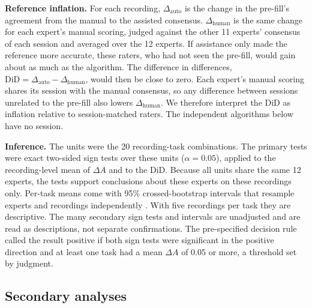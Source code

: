 \documentclass[11pt]{article}
\newcommand{\dA}{\Delta A}
\newcommand{\dauto}{\Delta_{\mathrm{auto}}}
\newcommand{\dhuman}{\Delta_{\mathrm{human}}}
\begin{document}
\textbf{Reference inflation.} For each recording, $\dauto$ is the change in the pre-fill's agreement from the manual
to the assisted consensus. $\dhuman$ is the same change for each expert's manual scoring, judged against the other
11 experts' consensus of each session and averaged over the 12 experts. If assistance only made the reference more
accurate, these raters, who had not seen the pre-fill, would gain about as much as the algorithm. The difference in
differences, $\mathrm{DiD}=\dauto-\dhuman$, would then be close to zero. Each expert's manual scoring shares its
session with the manual consensus, so any difference between sessions unrelated to the pre-fill also lowers
$\dhuman$. We therefore interpret the DiD as inflation relative to session-matched raters. The independent algorithms
below have no session.

\textbf{Inference.} The units were the 20 recording-task combinations. The primary tests were exact two-sided sign
tests over these units ($\alpha=0.05$), applied to the recording-level mean of $\dA$ and to the DiD. Because all units share the same 12 experts, the tests support conclusions about these experts on these
recordings only. Per-task means come with 95\% crossed-bootstrap intervals that resample experts and recordings
independently \citep{owen2007}. With five recordings per task they are descriptive. The many secondary sign tests and intervals are unadjusted and are read as descriptions, not separate
confirmations. The pre-specified decision rule called the result positive if both sign tests were significant in the positive
direction and at least one task had a mean $\dA$ of 0.05 or more, a threshold set by judgment.

\subsection{Secondary analyses}
\end{document}
